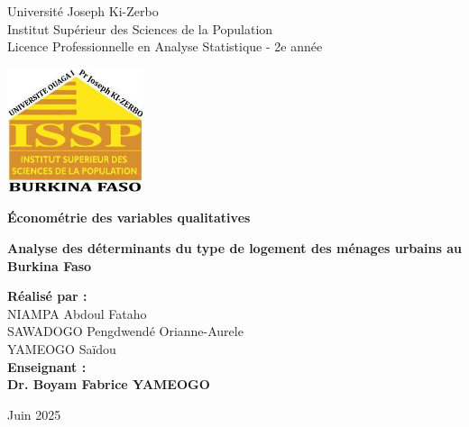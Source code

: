 \begin{titlepage}
    \centering
    \vspace{1.5cm}
    {\Large Université Joseph Ki-Zerbo \\ 
    Institut Supérieur des Sciences de la Population \\ 
    Licence Professionnelle en Analyse Statistique - 2e année \par}
    \vspace{1cm}

    \includegraphics[width=4cm]{logo.jpg}\\
    \vspace{1cm}
    {\Huge\bfseries Économétrie des variables qualitatives \par}
    \vspace{1cm}
    {\Huge\bfseries\textcolor{BrickRed}{Analyse des déterminants du type de logement des ménages urbains au Burkina Faso} \par}
    \vspace{1cm}
    \begin{flushleft}
        {\Large
        \textbf{Réalisé par :} \\
        NIAMPA Abdoul Fataho \\
        SAWADOGO Pengdwendé Orianne-Aurele \\
        YAMEOGO Saïdou \\
        \vspace{1cm}
        \textbf{Enseignant :} \\
        \textbf{Dr. Boyam Fabrice YAMEOGO}
        }
    \end{flushleft}
    \vfill
    \centering
    Juin 2025
\end{titlepage}
